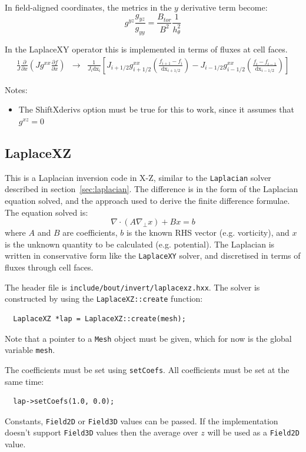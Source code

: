 \documentclass[12pt]{article}
\begin{document}
In field-aligned coordinates, the metrics in the $y$ derivative term become:
\[
g^{yz}\frac{g_{yz}}{g_{yy}} = \frac{B_{tor}}{B^2}\frac{1}{h_\theta^2}
\]

In the LaplaceXY operator this is implemented in terms of fluxes at cell faces. 
\begin{eqnarray*}
\frac{1}{J}\frac{\partial}{\partial x}\left(Jg^{xx}\frac{\partial f}{\partial x}\right) &\rightarrow& \frac{1}{J_i\mathrm{dx_i}}\left[J_{i+1/2}g^{xx}_{i+1/2}\left(\frac{f_{i+1} - f_{i}}{\mathrm{dx}_{i+1/2}}\right) - J_{i-1/2}g^{xx}_{i-1/2}\left(\frac{f_{i} - f_{i-1}}{\mathrm{dx}_{i-1/2}}\right)\right]
\end{eqnarray*}

Notes:
\begin{itemize}
\item The ShiftXderivs option must be true for this to work, since it assumes that $g^{xz} = 0$
\end{itemize}

\subsection{LaplaceXZ}

This is a Laplacian inversion code in X-Z, similar to the \texttt{Laplacian} solver described in section~\ref{sec:laplacian}. 
The difference is in the form of the Laplacian equation solved, and the approach used to derive the finite difference formulae.
The equation solved is:
\begin{equation}
  \nabla\cdot\left( A \nabla_\perp x \right) + Bx = b
\end{equation}
where $A$ and $B$ are coefficients, $b$ is the known RHS vector (e.g. vorticity), and $x$ is the unknown quantity to be calculated (e.g. potential). The
Laplacian is written in conservative form like the \texttt{LaplaceXY} solver,
and discretised in terms of fluxes through cell faces.

The header file is \texttt{include/bout/invert/laplacexz.hxx}. The solver is
constructed by using the \texttt{LaplaceXZ::create} function:
\begin{lstlisting}
  LaplaceXZ *lap = LaplaceXZ::create(mesh);
\end{lstlisting}
Note that a pointer to a \texttt{Mesh} object must be given, which for now is the global variable \lstinline!mesh!. 

The coefficients must be set using \lstinline!setCoefs!. All coefficients must be set at the same time:
\begin{lstlisting}
  lap->setCoefs(1.0, 0.0);
\end{lstlisting}
Constants, \lstinline!Field2D! or \lstinline!Field3D! values can be passed.
If the implementation doesn't support \lstinline!Field3D! values then 
the average over $z$ will be used as a \lstinline!Field2D! value.
\end{document}
